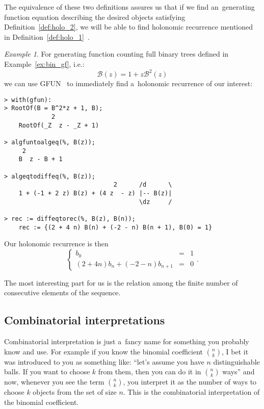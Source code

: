 \documentclass[final]{article}
\theoremstyle{definition}
\theoremstyle{definition}
\theoremstyle{remark}
\newtheorem{example}{Example}[subsection]
\newcommand{\gf}[1]{\ensuremath{\mathcal{#1}}}
\begin{document}
The equivalence of these two definitions assures us that if we find an~generating function equation describing the desired objects satisfying Definition~\ref{def:holo_2}, we will be able to find holonomic recurrence mentioned in Definition~\ref{def:holo_1}~\cite{complexity}.

\begin{example}%
    \label{ex:gfun-rec}
    For generating function counting full binary trees defined in Example~\ref{ex:bin_gf}, i.e.:
    \[\gf{B}(z) = 1 + z\gf{B}^2(z)\]
    we can use GFUN~\cite{gfun} to immediately find a~holonomic recurrence of our interest:

    \begin{lstlisting}
> with(gfun):
> RootOf(B = B^2*z + 1, B);
             2
    RootOf(_Z  z - _Z + 1)

> algfuntoalgeq(%, B(z));
     2
    B  z - B + 1

> algeqtodiffeq(%, B(z));
                              2      /d      \
    1 + (-1 + 2 z) B(z) + (4 z  - z) |-- B(z)|
                                     \dz     /

> rec := diffeqtorec(%, B(z), B(n));
    rec := {(2 + 4 n) B(n) + (-2 - n) B(n + 1), B(0) = 1}
    \end{lstlisting}

    Our holonomic recurrence is then
    \[\left\{\begin{array}{rcl}
                b_0 &=& 1\\
                (2 + 4 n) b_n + (-2 - n) b_{n + 1} &=& 0
    \end{array}\right..\]

    The most interesting part for us is the relation among the finite number of consecutive elements of the sequence.
\end{example}

\subsection{Combinatorial interpretations}%
\label{sub:combinatorial_interpretations}

Combinatorial interpretation is just a~fancy name for something you probably know and use. For example if you know the binomial coefficient \(\binom{n}{k}\), I bet it was introduced to you as something like: ``let's assume you have \(n\) distinguishable balls. If you want to choose \(k\) from them, then you can do it in \(\binom{n}{k}\) ways'' and now, whenever you see the term \(\binom{n}{k}\), you interpret it as the number of ways to choose \(k\) objects from the set of size \(n\). This is the combinatorial interpretation of the binomial coefficient.
\end{document}

